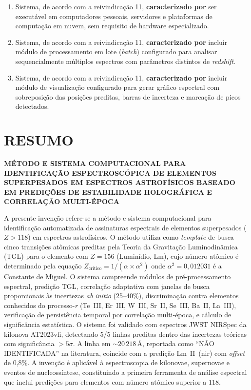 \documentclass[12pt,a4paper]{article}
\newcommand{\alphaii}{\alpha^2}
\newcommand{\Zcrit}{Z_{\text{cr\'{i}tico}}}
\begin{document}
\begin{enumerate}
\item Sistema, de acordo com a reivindicação 11,
\textbf{caracterizado por} ser executável em computadores pessoais,
servidores e plataformas de computação em nuvem, sem requisito de
hardware especializado.

\item Sistema, de acordo com a reivindicação 11,
\textbf{caracterizado por} incluir módulo de processamento em
lote (\textit{batch}) configurado para analisar sequencialmente
múltiplos espectros com parâmetros distintos de \textit{redshift}.

\item Sistema, de acordo com a reivindicação 11,
\textbf{caracterizado por} incluir módulo de visualização
configurado para gerar gráfico espectral com sobreposição das
posições preditas, barras de incerteza e marcação de picos
detectados.

\end{enumerate}

\newpage
\section*{RESUMO}

\begin{center}
{\large\bfseries MÉTODO E SISTEMA COMPUTACIONAL PARA IDENTIFICAÇÃO
ESPECTROSCÓPICA DE ELEMENTOS SUPERPESADOS EM ESPECTROS
ASTROFÍSICOS BASEADO EM PREDIÇÕES DE ESTABILIDADE HOLOGRÁFICA E
CORRELAÇÃO MULTI-ÉPOCA}
\end{center}

\vspace{0.5cm}

A presente invenção refere-se a método e sistema computacional para
identificação automatizada de assinaturas espectrais de elementos
superpesados ($Z > 118$) em espectros astrofísicos. O método
utiliza como \textit{template} de busca cinco transições atômicas
preditas pela Teoria da Gravitação Luminodinâmica (TGL) para o
elemento com $Z = 156$ (Luminídio, Lm), cujo número atômico é
determinado pela equação $\Zcrit = 1/(\alpha \times \alphaii)$
onde $\alphaii = 0{,}012031$ é a Constante de Miguel. O sistema
compreende módulos de pré-processamento espectral, predição TGL,
correlação adaptativa com janelas de busca proporcionais às
incertezas \textit{ab initio} (25--40\%), discriminação contra
elementos conhecidos do processo-\textit{r} (Te~III, Er~III,
W~III, Sr~II, Se~III, Ba~II, La~III), verificação de persistência
temporal por correlação multi-época, e cálculo de significância
estatística. O sistema foi validado com espectros JWST NIRSpec da
kilonova AT2023vfi, detectando 5/5 linhas preditas dentro das
incertezas teóricas com significância $> 5\sigma$. A linha em
${\sim}20\,218$\,\AA, reportada como ``NÃO IDENTIFICADA'' na
literatura, coincide com a predição Lm~II~(nir) com \textit{offset}
de 0,8\%. A invenção é aplicável à espectroscopia de kilonovae,
supernovae e eventos de nucleossíntese, constituindo a primeira
ferramenta de análise espectral que inclui predições para elementos
com número atômico superior a 118.
\end{document}
